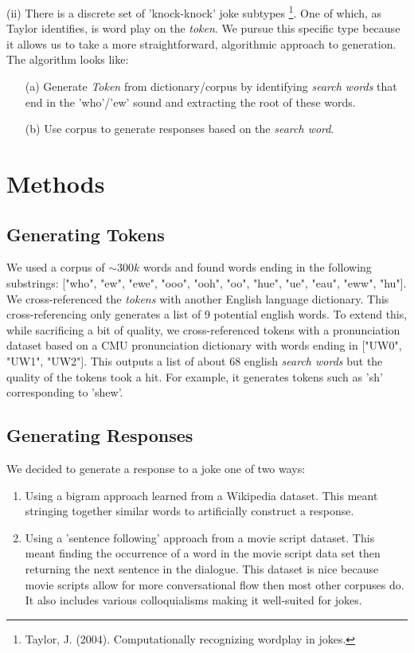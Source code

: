 \documentclass[twoside,twocolumn]{article}
\begin{document}
\noindent (ii) There is a discrete set of 'knock-knock' joke subtypes \footnote{Taylor, J. (2004). Computationally recognizing wordplay in jokes.}.
One of which, as Taylor identifies, is word play on the \emph{token}. We pursue this specific type because it allows us to take a more straightforward, algorithmic approach to generation.
The algorithm looks like:
\begin{center}
    \begin{enumerate}
    \item[(a)] Generate \emph{Token} from dictionary/corpus by identifying \emph{search words} that end in the 'who'/'ew' sound and extracting the root of these words.
    \item[(b)] Use corpus to generate responses based on the \emph{search word}.
    \end{enumerate}
\end{center}



\section{Methods}

\subsection{Generating Tokens}

We used a corpus of $\sim 300k$ words and found words ending in the following substrings: ["who", "ew", "ewe", "ooo", "ooh", "oo", "hue", "ue", "eau", "eww", "hu"].  We cross-referenced the \emph{tokens} with another English language dictionary. This cross-referencing only generates a list of 9 potential english words. To extend this, while sacrificing a bit of quality, we cross-referenced tokens with a pronunciation dataset based on a CMU pronunciation dictionary with words ending in ["UW0", "UW1", "UW2"]. This outputs a list of about 68 english \emph{search words} but the quality of the tokens took a hit. For example, it generates tokens such as 'sh' corresponding to 'shew'. 

\subsection{Generating Responses}
We decided to generate a response to a joke one of two ways:
\begin{enumerate}[label=(\roman*)]
\item Using a bigram approach learned from a Wikipedia dataset. This meant stringing together similar words to artificially construct a response.
\item Using a 'sentence following' approach from a movie script dataset. This meant finding the occurrence of a word in the movie script data set then returning the next sentence in the dialogue.
This dataset is nice because movie scripts allow for more conversational flow then most other corpuses do. It also includes various colloquialisms making it well-suited for jokes.
\end{enumerate}
\end{document}

